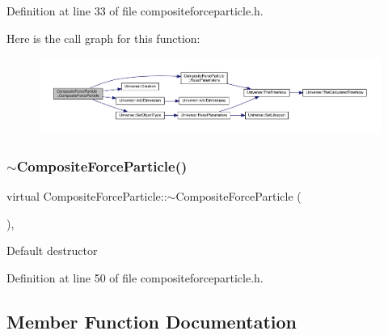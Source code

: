 Definition at line 33 of file compositeforceparticle.\+h.

Here is the call graph for this function\+:\nopagebreak
\begin{figure}[H]
\begin{center}
\leavevmode
\includegraphics[width=350pt]{class_composite_force_particle_a8c311b3e35f6def3a532346a50c15281_cgraph}
\end{center}
\end{figure}
\mbox{\label{class_composite_force_particle_aa35ee4244375b2bcc5dd775de30aa39e}} 
\subsubsection{\texorpdfstring{$\sim$\+Composite\+Force\+Particle()}{~CompositeForceParticle()}}
{\footnotesize\ttfamily virtual Composite\+Force\+Particle\+::$\sim$\+Composite\+Force\+Particle (\begin{DoxyParamCaption}{ }\end{DoxyParamCaption})\hspace{0.3cm}{\ttfamily [inline]}, {\ttfamily [virtual]}}

Default destructor 

Definition at line 50 of file compositeforceparticle.\+h.



\subsection{Member Function Documentation}
\mbox{\label{class_composite_force_particle_aed3a7ebcb98626c564dde2d54d45ff03}} 
